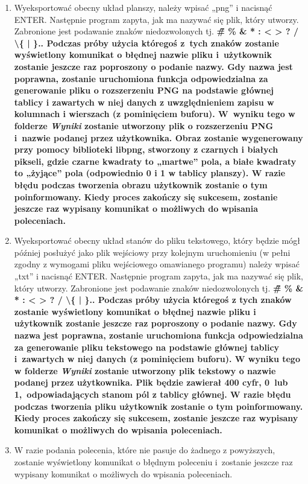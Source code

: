 \documentclass[12pt]{report}
\begin{document}
\begin{enumerate}
\begin{enumerate}
\begin{enumerate}
        \item Wyeksportować obecny układ planszy, należy wpisać „png” i nacisnąć ENTER. Następnie program zapyta, jak ma nazywać się plik, który utworzy. Zabronione jest podawanie znaków niedozwolonych tj. \bfseries\~  \"\# \% \& * : < > ? / \textbackslash \{ | \}.\mdseries  . Podczas próby użycia któregoś z~tych znaków zostanie wyświetlony komunikat o błędnej nazwie pliku i~użytkownik zostanie jeszcze raz poproszony o podanie nazwy. Gdy nazwa jest poprawna, zostanie uruchomiona funkcja odpowiedzialna za generowanie pliku o rozszerzeniu PNG na podstawie głównej tablicy i zawartych w niej danych z uwzględnieniem zapisu w kolumnach i wierszach (z pominięciem buforu). W~wyniku tego w folderze \textit{Wyniki} zostanie utworzony plik o rozszerzeniu PNG i~nazwie podanej przez użytkownika. Obraz zostanie wygenerowany przy pomocy biblioteki libpng, stworzony z czarnych i białych pikseli, gdzie czarne kwadraty to „martwe” pola, a białe kwadraty to „żyjące” pola (odpowiednio 0 i 1 w tablicy planszy). W razie błędu podczas tworzenia obrazu użytkownik zostanie o tym poinformowany. Kiedy proces zakończy się sukcesem, zostanie jeszcze raz wypisany komunikat o możliwych do wpisania poleceniach.
        \item Wyeksportować obecny układ stanów do pliku tekstowego, który będzie mógł później posłużyć jako plik wejściowy przy kolejnym uruchomieniu (w pełni zgodny z wymogami pliku wejściowego omawianego programu) należy wpisać „txt” i nacisnąć ENTER. Następnie program zapyta, jak ma nazywać się plik, który utworzy. Zabronione jest podawanie znaków niedozwolonych tj. \bfseries\~  \"\# \% \& * : < > ? / \textbackslash \{ | \}.\mdseries . Podczas próby użycia któregoś z tych znaków zostanie wyświetlony komunikat o błędnej nazwie pliku i użytkownik zostanie jeszcze raz poproszony o podanie nazwy. Gdy nazwa jest poprawna, zostanie uruchomiona funkcja odpowiedzialna za generowanie pliku tekstowego na podstawie głównej tablicy i~zawartych w niej danych (z pominięciem buforu). W wyniku tego w folderze \textit{Wyniki} zostanie utworzony plik tekstowy o nazwie podanej przez użytkownika. Plik będzie zawierał 400 cyfr, 0~lub 1,~odpowiadających stanom pól z tablicy głównej. W razie błędu podczas tworzenia pliku użytkownik zostanie o tym poinformowany. Kiedy proces zakończy się sukcesem, zostanie jeszcze raz wypisany komunikat o możliwych do wpisania poleceniach.
        \item W razie podania polecenia, które nie pasuje do żadnego z powyższych, zostanie wyświetlony komunikat o błędnym poleceniu i~zostanie jeszcze raz wypisany komunikat o możliwych do wpisania poleceniach.

\end{enumerate}
\end{enumerate}
\end{enumerate}
\end{document}
